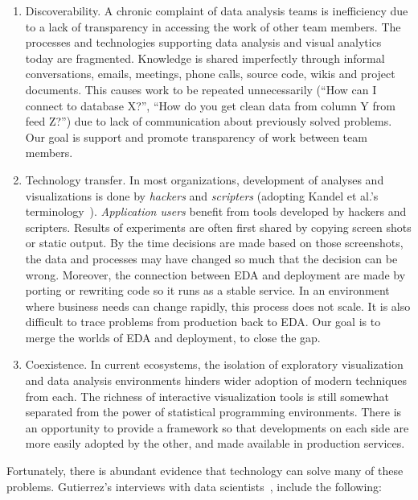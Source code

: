 \begin{enumerate}
\item Discoverability. A chronic complaint of data analysis teams is
inefficiency due to a lack of transparency in accessing the work of
other team members. The processes and technologies supporting
data analysis and visual analytics today are fragmented.
Knowledge is shared imperfectly through informal conversations, emails,
meetings, phone calls, source code, wikis and project documents.
This causes work to be repeated unnecessarily
(``How can I connect to database X?'', ``How do you get clean data
from column Y from feed Z?'') due to lack of communication about
previously solved problems. 
Our goal is support and
promote transparency of work between team members.

\item Technology transfer.
In most organizations, development of analyses and visualizations 
is done by \emph{hackers} and \emph{scripters} (adopting Kandel et al.'s
terminology~\cite{Kandel:2012:EDA}). \emph{Application users} 
benefit from tools developed by hackers and scripters.
Results of experiments are often first shared by copying screen
shots or static output. By the time decisions are made based on
those screenshots, the data and processes may have
changed so much that the decision can be wrong.
Moreover, the connection between EDA and deployment
are made by porting or rewriting code so it runs as a stable service.
In an environment where business needs can change rapidly, this
process does not scale. It is also difficult to trace problems
from production back to EDA.
Our goal is to merge the worlds of EDA and deployment, to close the gap.

\item Coexistence. In current ecosystems, the isolation of exploratory
visualization and data analysis environments hinders wider adoption of
modern techniques from each.
The richness of interactive visualization tools is still somewhat
separated from the power of statistical programming environments.
There is an opportunity to provide a framework so that developments
on each side are more easily adopted by the other, and made available
in production services.

\end{enumerate}

Fortunately, there is abundant evidence that technology can
solve many of these problems.
Gutierrez's interviews with data scientists~\cite{Gutierrez:2014:DSA}, 
include the following:

